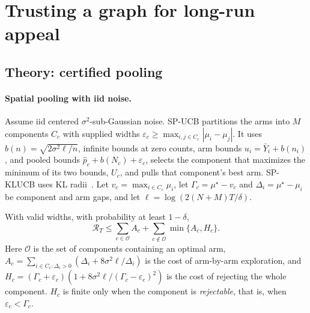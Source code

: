 \documentclass[sigconf,review,anonymous]{acmart}
\begin{document}
\section{Trusting a graph for long-run appeal}\label{sec:pool}

\subsection{Theory: certified pooling}

\paragraph{Spatial pooling with iid noise.} Assume iid centered $\sigma^2$-sub-Gaussian noise. SP-UCB partitions the arms into $M$ components $C_c$ with supplied widths $\varepsilon_c\ge\max_{i,j\in C_c}|\mu_i-\mu_j|$. It uses $b(n)=\sqrt{2\sigma^2\ell/n}$, infinite bounds at zero counts, arm bounds $u_i=\bar Y_i+b(n_i)$, and pooled bounds $\hat p_c+b(N_c)+\varepsilon_c$, selects the component that maximizes the minimum of its two bounds, $U_c$, and pulls that component's best arm. SP-KLUCB uses KL radii~\cite{garivier2011klucb}. Let $v_c=\max_{i\in C_c}\mu_i$, let $\Gamma_c=\mu^\star-v_c$ and $\Delta_i=\mu^\star-\mu_i$ be component and arm gaps, and let $\ell=\log(2(N+M)T/\delta)$.

\begin{theorem}\label{thm:a1}
With valid widths, with probability at least $1-\delta$,
\[
\mathcal R_T\le\textstyle\sum_{c\in\mathcal O}A_c+\sum_{c\notin\mathcal O}\min\{A_c,H_c\}.
\]
Here $\mathcal O$ is the set of components containing an optimal arm, $A_c=\sum_{i\in C_c:\Delta_i>0}(\Delta_i+8\sigma^2\ell/\Delta_i)$ is the cost of arm-by-arm exploration, and $H_c=(\Gamma_c+\varepsilon_c)(1+8\sigma^2\ell/(\Gamma_c-\varepsilon_c)^2)$ is the cost of rejecting the whole component. $H_c$ is finite only when the component is \emph{rejectable}, that is, when $\varepsilon_c<\Gamma_c$.
\end{theorem}
\end{document}
